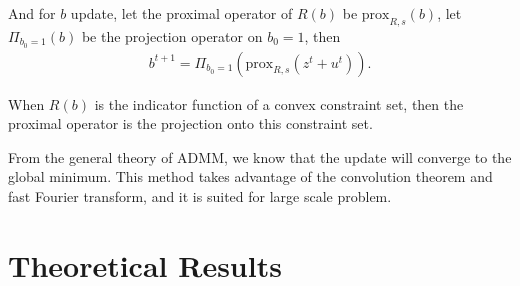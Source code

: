 \documentclass[letter, 10pt]{article}
\numberwithin{equation}{section}
\begin{document}
  And for $b$ update, let the proximal operator of $ R(b)$ be $\mbox{prox}_{R, s}(b)$, let $\Pi_{b_0=1}(b)$ be the projection operator on $b_0 =1$, then
     \begin{eqnarray*}
 b^{t+1}
 = \Pi_{b_0=1}(\mbox{prox}_{R, s}(z^t+u^t)).
  \end{eqnarray*}

When $R(b)$ is the indicator function of a convex constraint set, then the proximal operator is the projection onto this constraint set.
  
From the general theory of ADMM, we know that the update will converge to the global minimum. This method takes advantage of the convolution theorem and fast Fourier transform, and it is suited for large scale problem.



 

 
 
 
\section{Theoretical Results}
\end{document}
